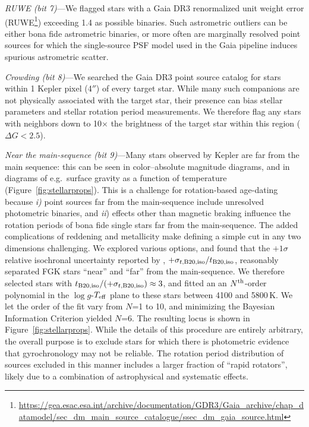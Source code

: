 \documentclass[11pt,twocolumn,tighten]{aastex63}
\begin{document}
{\it RUWE (bit 7)}---We flagged stars with a Gaia DR3 renormalized
unit weight error
(RUWE\footnote{\url{https://gea.esac.esa.int/archive/documentation/GDR3/Gaia_archive/chap_datamodel/sec_dm_main_source_catalogue/ssec_dm_gaia_source.html}})
exceeding 1.4 as possible binaries.  Such astrometric outliers can be
either bona fide astrometric binaries, or more often are marginally
resolved point sources for which the single-source PSF model used in
the Gaia pipeline induces spurious astrometric scatter.

{\it Crowding (bit 8)}---We searched the Gaia DR3 point source catalog
for stars within 1 Kepler pixel (4$''$) of every target star.  While
many such companions are not physically associated with the target
star, their presence can bias stellar parameters and stellar rotation
period measurements.  We therefore flag any stars with neighbors down
to 10$\times$ the brightness of the target star within this region
($\Delta G < 2.5$).

{\it Near the main-sequence (bit 9)}---Many stars observed by Kepler
are far from the main sequence: this can be seen in color--absolute
magnitude diagrams, and in diagrams of e.g.~surface gravity as a
function of temperature (Figure~\ref{fig:stellarprops}).  This is a
challenge for rotation-based age-dating because {\it i)} point sources
far from the main-sequence include unresolved photometric binaries,
and {\it ii}) effects other than magnetic braking influence the
rotation periods of bona fide single stars far from the main-sequence.
The added complications of reddening and metallicity make defining a
simple cut in any two dimensions challenging.  We explored various
options, and found that the $+1$$\sigma$ relative isochronal
uncertainty reported by \citet{Berger_2020a_catalog}, $+\sigma_{t,{\rm
B20,iso}}/t_{\rm B20,iso}$, reasonably separated FGK stars ``near'' and
``far'' from the main-sequence.  We therefore selected stars with
$t_{\rm B20,iso}/(+\sigma_{t,{\rm B20,iso}})\approx 3$, and fitted an
an $N^{\rm th}$-order polynomial in the $\log g$-$T_{\rm eff}$ plane
to these stars between 4100 and 5800\,K.  We let the order of the fit
vary from $N$=1 to 10, and minimizing the Bayesian Information Criterion
yielded $N$=6.  The resulting locus is shown in
Figure~\ref{fig:stellarprops}.  While the details of this procedure
are entirely arbitrary, the overall purpose is to exclude stars for
which there is photometric evidence that gyrochronology may not be
reliable.  The rotation period distribution of sources excluded in
this manner includes a larger fraction of ``rapid rotators'', likely
due to a combination of astrophysical and systematic effects.
\end{document}

